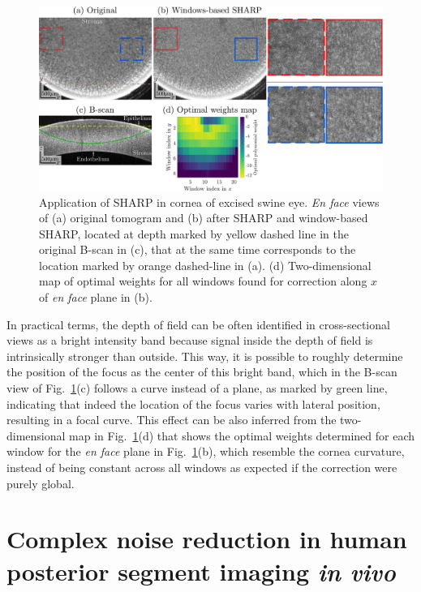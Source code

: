 \begin{figure}[htb!]
	\centering
	\includegraphics[width=\textwidth]{Figures/Results/CorneaImaging.pdf}
	\caption[Application of SHARP in cornea of excised swine eye.]{Application of SHARP in cornea of excised swine eye. \textit{En face} views of (a) original tomogram and (b) after SHARP and window-based SHARP, located at depth marked by yellow dashed line in the original B-scan in (c), that at the same time corresponds to the location marked by orange dashed-line in (a). (d) Two-dimensional map of optimal 
	weights for all windows found for correction along $x$ of \textit{en face} plane in (b).}
	\label{fig:ConrealImaging}
\end{figure}

In practical terms, the depth of field can be often identified in cross-sectional views as a bright intensity band because signal inside the depth of field is intrinsically stronger than outside. This way, it is possible to roughly determine the position of the focus as the center of this bright band, which in the B-scan view of Fig.~\ref{fig:ConrealImaging}(c) follows a curve instead of a plane, as marked by green line, indicating that indeed the location of the focus varies with lateral position, resulting in a focal curve. This effect can be also inferred from the two-dimensional map in Fig.~\ref{fig:ConrealImaging}(d) that shows the optimal weights determined for each window for the \textit{en face} plane in Fig.~\ref{fig:ConrealImaging}(b), which resemble the cornea curvature, instead of being constant across all windows as expected if the correction were purely global.

\FloatBarrier

\section{Complex noise reduction in human posterior segment imaging \textit{in vivo}}

